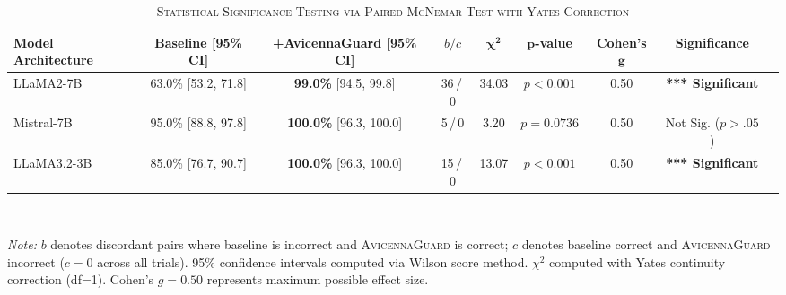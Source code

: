 \begin{table}[t]
\centering
\caption{\textsc{Statistical Significance Testing via Paired McNemar Test with Yates Correction}}
\label{tab:mcnemar_significance}
\begin{tabular}{lcccccccc}
  \toprule
  \textbf{Model Architecture} & \textbf{Baseline [95\% CI]} & \textbf{+AvicennaGuard [95\% CI]} & \textbf{$b / c$} & $\boldsymbol{\chi^2}$ & $\boldsymbol{p}$\textbf{-value} & \textbf{Cohen's} $\boldsymbol{g}$ & \textbf{Significance} \\
  \midrule
  LLaMA2-7B & 63.0\% [53.2, 71.8] & \textbf{99.0\%} [94.5, 99.8] & 36\,/\,0 & 34.03 & $p < 0.001$ & 0.50 & \textbf{*** Significant} \\
  Mistral-7B & 95.0\% [88.8, 97.8] & \textbf{100.0\%} [96.3, 100.0] & 5\,/\,0 & 3.20 & $p = 0.0736$ & 0.50 & Not Sig. ($p > .05$) \\
  LLaMA3.2-3B & 85.0\% [76.7, 90.7] & \textbf{100.0\%} [96.3, 100.0] & 15\,/\,0 & 13.07 & $p < 0.001$ & 0.50 & \textbf{*** Significant} \\
  \bottomrule
\end{tabular}
\vspace{1mm}
\\[-1mm]
\raggedright
\footnotesize{\textit{Note:} $b$ denotes discordant pairs where baseline is incorrect and \textsc{AvicennaGuard} is correct; $c$ denotes baseline correct and \textsc{AvicennaGuard} incorrect ($c=0$ across all trials). 95\% confidence intervals computed via Wilson score method. $\chi^2$ computed with Yates continuity correction (df=1). Cohen's $g = 0.50$ represents maximum possible effect size.}
\end{table}
